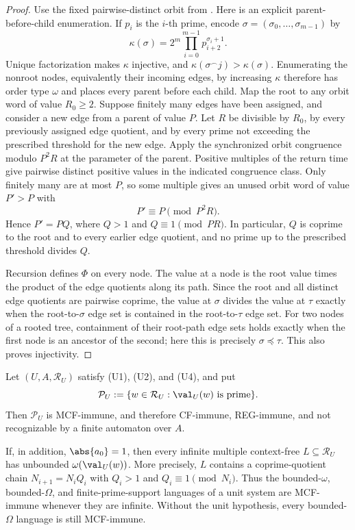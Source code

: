 \begin{proof}
  Use the fixed pairwise-distinct orbit from
  . Here is an explicit
  parent-before-child enumeration. If \(p_i\) is the \(i\)-th prime, encode
  \(\sigma=(\sigma_0,\ldots,\sigma_{m-1})\) by
  \[
    \kappa(\sigma)=2^m\prod_{i=0}^{m-1}p_{i+2}^{\sigma_i+1}.
  \]
  Unique factorization makes \(\kappa\) injective, and
  \(\kappa(\sigma^\frown j)>\kappa(\sigma)\). Enumerating the nonroot
  nodes, equivalently their incoming edges, by increasing \(\kappa\)
  therefore has order type \(\omega\) and places every parent before each
  child. Map
  the root to any orbit word of value \(R_0\ge2\). Suppose finitely many
  edges have been assigned, and consider a new edge from a parent of
  value \(P\). Let \(R\) be divisible by \(R_0\), by every previously
  assigned edge quotient, and by every prime not exceeding the prescribed
  threshold for the new edge. Apply the synchronized orbit congruence
  modulo \(P^2R\) at the parameter of the parent. Positive multiples of
  the return time give pairwise distinct positive values in the indicated
  congruence class. Only finitely many are at most \(P\), so some multiple
  gives an unused orbit word of value \(P'>P\) with
  \[
    P'\equiv P\pmod {P^2R}.
  \]
  Hence \(P'=PQ\), where \(Q>1\) and \(Q\equiv1\pmod {PR}\). In
  particular, \(Q\) is coprime to the root and to every earlier edge
  quotient, and no prime up to the prescribed threshold divides \(Q\).

  Recursion defines \(\Phi\) on every node. The value at a node is the
  root value times the product of the edge quotients along its path.
  Since the root and all distinct edge quotients are pairwise coprime,
  the value at \(\sigma\) divides the value at \(\tau\) exactly when the
  root-to-\(\sigma\) edge set is contained in the root-to-\(\tau\) edge
  set. For two nodes of a rooted tree, containment of their root-path edge
  sets holds exactly when the first node is an ancestor of the second;
  here this is precisely \(\sigma\preceq\tau\). This also proves injectivity.
\end{proof}

\begin{theorem}
  \label{thm:recurrent-numeration-prime-cf-immunity}
  Let \((U,A,\mathcal R_U)\) satisfy \textup{(U1)}, \textup{(U2)}, and
  \textup{(U4)}, and put
  \[
    \mathcal P_U
      :=\{w\in\mathcal R_U:\val_U(w)\text{ is prime}\}.
  \]
  Then \(\mathcal P_U\) is MCF-immune, and therefore CF-immune,
  REG-immune, and not recognizable by a finite automaton over \(A\).

  If, in addition, \(\abs{a_0}=1\), then every infinite multiple
  context-free
  \(L\subseteq\mathcal R_U\) has unbounded
  \(\omega(\val_U(w))\). More precisely, \(L\) contains a
  coprime-quotient chain \(N_{i+1}=N_iQ_i\) with
  \(Q_i>1\) and \(Q_i\equiv1\pmod {N_i}\). Thus the bounded-\(\omega\),
  bounded-\(\Omega\), and finite-prime-support languages of a unit
  system are MCF-immune whenever they are infinite. Without the unit
  hypothesis, every bounded-\(\Omega\) language is still MCF-immune.
\end{theorem}


